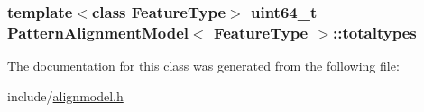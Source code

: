\subsubsection[{totaltypes}]{\setlength{\rightskip}{0pt plus 5cm}template$<$class Feature\+Type$>$ uint64\+\_\+t {\bf Pattern\+Alignment\+Model}$<$ Feature\+Type $>$\+::totaltypes\hspace{0.3cm}{\ttfamily [protected]}}\label{classPatternAlignmentModel_a36279cac113c61b57f4a95df6e0a07b7}


The documentation for this class was generated from the following file\+:\begin{DoxyCompactItemize}
\item 
include/\hyperlink{alignmodel_8h}{alignmodel.\+h}\end{DoxyCompactItemize}
